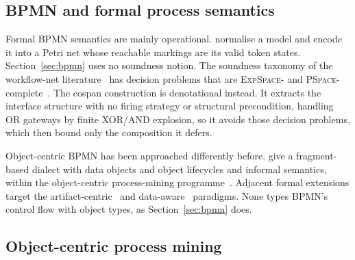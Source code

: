 \subsection{BPMN and formal process semantics}\label{subsec:bpmn-related}

Formal BPMN semantics are mainly operational. \citet{dijkmanSemanticsAnalysisBusiness2008} normalise a model and encode it into a Petri net
whose reachable markings are its valid token states. Section~\ref{sec:bpmn} uses no soundness notion. The soundness taxonomy of the workflow-net
literature~\cite{vanderaalstSoundnessWorkflowNets2011} has decision problems that are
\textsc{ExpSpace}- and \textsc{PSpace}-complete~\cite{blondinComplexitySoundnessWorkflow2022}. The
cospan construction is denotational instead. It extracts the interface structure with no firing
strategy or structural precondition, handling OR gateways by finite XOR/AND explosion, so it
avoids those decision problems, which then bound only the composition it defers.

Object-centric BPMN has been approached differently before. \citet{seidelObjectcentricBPMNProcess2024} give a fragment-based dialect with data objects and object
lifecycles and informal semantics, within the object-centric process-mining
programme~\cite{vanderaalstObjectCentricProcessMining2023,bertiAdvancementsChallengesObjectCentric2023}. Adjacent formal
extensions target the artifact-centric~\cite{lohmannArtifactCentricModelingUsing2012} and
data-aware~\cite{calvaneseFormalModelingSMTBased2019} paradigms. None types BPMN's control flow with object
types, as Section~\ref{sec:bpmn} does.

\subsection{Object-centric process mining}

